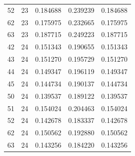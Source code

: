 \begin{longtable}{rrrrr}
52 & 23 & 0.184688 & 0.239239 & 0.184688\\
62 & 23 & 0.175975 & 0.232665 & 0.175975\\
63 & 23 & 0.187715 & 0.249223 & 0.187715\\
42 & 24 & 0.151343 & 0.190655 & 0.151343\\
43 & 24 & 0.151270 & 0.195729 & 0.151270\\
44 & 24 & 0.149347 & 0.196119 & 0.149347\\
45 & 24 & 0.144734 & 0.190137 & 0.144734\\
50 & 24 & 0.139537 & 0.189122 & 0.139537\\
51 & 24 & 0.154024 & 0.204463 & 0.154024\\
52 & 24 & 0.142678 & 0.183337 & 0.142678\\
62 & 24 & 0.150562 & 0.192880 & 0.150562\\
63 & 24 & 0.143256 & 0.184220 & 0.143256\\
\end{longtable}
\endgroup

